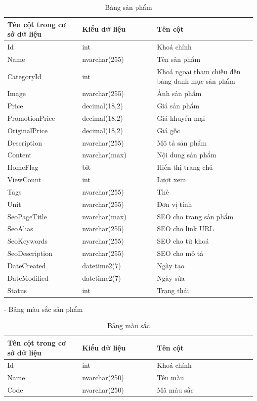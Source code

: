 \begin{longtable}[htp]{ |m{0.3\linewidth}|m{0.3\linewidth}|m{0.4\linewidth}|}
\caption{Bảng sản phẩm \label{database}}\\
 \hline
 Tên cột trong cơ sở dữ liệu & Kiểu dữ liệu & Tên cột  \\
 \hline
  Id&int&Khoá chính\\
 \hline
 Name&nvarchar(255)&Tên sản phẩm\\
 \hline
 CategoryId&int&Khoá ngoại tham chiếu đến bảng danh mục sản phẩm\\
 \hline
 Image&nvarchar(255)&Ảnh sản phẩm\\
 \hline 
 Price&decimal(18,2)&Giá sản phẩm\\
\hline
 PromotionPrice&decimal(18,2)&Giá khuyển mại\\
\hline
 OriginalPrice&decimal(18,2)&Giá gốc\\
 \hline
 Description&nvarchar(255)&Mô tả sản phẩm\\
 \hline
 Content&nvarchar(max)&Nội dung sản phẩm\\
 \hline
 HomeFlag&bit&Hiển thị trang chủ\\
 \hline
 ViewCount&int&Lượt xem\\
 \hline
 Tags&nvarchar(255)&Thẻ\\
 \hline
 Unit&nvarchar(255)&Đơn vị tính\\
 \hline
 SeoPageTitle&nvarchar(max)&SEO cho trang sản phẩm\\
 \hline
 SeoAlias&nvarchar(255)&SEO cho link URL\\
 \hline
 SeoKeywords&nvarchar(255)&SEO cho từ khoá\\
 \hline
 SeoDescription&nvarchar(255)&SEO cho mô tả \\
 \hline
 DateCreated&datetime2(7)&Ngày tạo\\
 \hline
 DateModified&datetime2(7)&Ngày sửa\\
 \hline
 Status&int&Trạng thái\\
 \hline
\end{longtable}
- Bảng màu sắc sản phẩm
\begin{longtable}[htp]{ |m{0.3\linewidth}|m{0.3\linewidth}|m{0.4\linewidth}|}
\caption{Bảng màu sắc \label{database}}\\
\hline
Tên cột trong cơ sở dữ liệu & Kiểu dữ liệu & Tên cột  \\
\hline
Id&int&Khoá chính\\
\hline
Name&nvarchar(250)&Tên màu\\
\hline
Code&nvarchar(250)&Mã màu sắc\\
\hline
\end{longtable}

